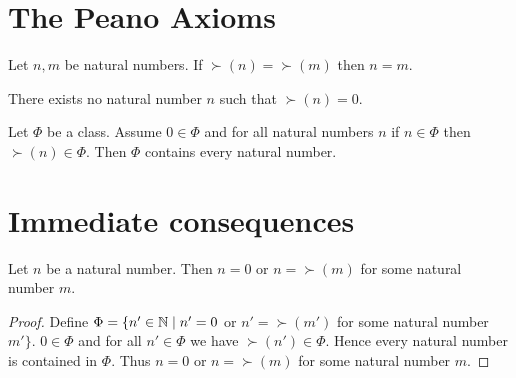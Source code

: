 \documentclass[../arithmetic.tex]{subfiles}
\begin{document}
  \section{The Peano Axioms}

  \begin{forthel}
    \begin{axiom}
      Let $n, m$ be natural numbers.
      If $\succ(n) = \succ(m)$ then $n = m$.
    \end{axiom}
  \end{forthel}

  \begin{forthel}
    \begin{axiom}
      There exists no natural number $n$ such that $\succ(n) = 0$.
    \end{axiom}
  \end{forthel}

  \begin{forthel}
    \begin{axiom}
      Let $\Phi$ be a class.
      Assume $0 \in \Phi$ and for all natural numbers $n$ if $n \in \Phi$ then
      $\succ(n) \in \Phi$.
      Then $\Phi$ contains every natural number.
    \end{axiom}
  \end{forthel}


  \section{Immediate consequences}

  \begin{forthel}
    \begin{proposition}
      Let $n$ be a natural number.
      Then $n = 0$ or $n = \succ(m)$ for some natural number $m$.
    \end{proposition}
    \begin{proof}
      Define $\Phi = \{ n' \in \mathbb{N} \mid n' = 0$ or $n' = \succ(m')$ for some
      natural number $m' \}$.
      $0 \in \Phi$ and for all $n' \in  \Phi$ we have $\succ(n') \in \Phi$.
      Hence every natural number is contained in $\Phi$.
      Thus $n = 0$ or $n = \succ(m)$ for some natural number $m$.
    \end{proof}
  \end{forthel}
\end{document}
